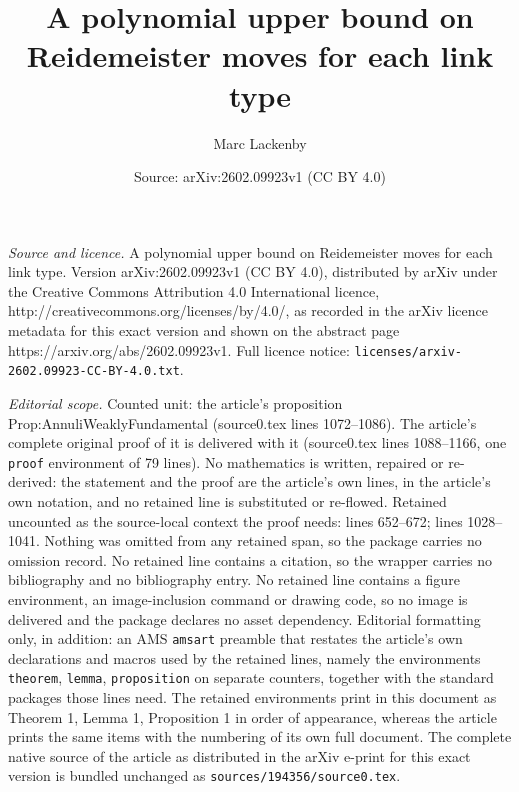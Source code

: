 \documentclass[10pt,a4paper]{amsart}
\title{A polynomial upper bound on Reidemeister moves for each link type}
\author{Marc Lackenby}
\date{Source: arXiv:2602.09923v1 (CC BY 4.0)}
\begin{document}
\maketitle

\noindent\emph{Source and licence.} A polynomial upper bound on Reidemeister moves for each link type. Version arXiv:2602.09923v1 (CC BY 4.0), distributed by arXiv under the Creative Commons Attribution 4.0 International licence, http://creativecommons.org/licenses/by/4.0/, as recorded in the arXiv licence metadata for this exact version and shown on the abstract page https://arxiv.org/abs/2602.09923v1. Full licence notice: \texttt{licenses/arxiv-2602.09923-CC-BY-4.0.txt}.\par\smallskip

\noindent\textit{Editorial scope.} Counted unit: the article's proposition Prop:AnnuliWeaklyFundamental (source0.tex lines 1072--1086). The article's complete original proof of it is delivered with it (source0.tex lines 1088--1166, one \texttt{proof} environment of 79 lines). No mathematics is written, repaired or re-derived: the statement and the proof are the article's own lines, in the article's own notation, and no retained line is substituted or re-flowed.  Retained uncounted as the source-local context the proof needs: lines 652--672; lines 1028--1041.  Nothing was omitted from any retained span, so the package carries no omission record.  No retained line contains a citation, so the wrapper carries no bibliography and no bibliography entry.  No retained line contains a figure environment, an image-inclusion command or drawing code, so no image is delivered and the package declares no asset dependency.  Editorial formatting only, in addition: an AMS \texttt{amsart} preamble that restates the article's own declarations and macros used by the retained lines, namely the environments \texttt{theorem}, \texttt{lemma}, \texttt{proposition} on separate counters, together with the standard packages those lines need.  The retained environments print in this document as Theorem 1, Lemma 1, Proposition 1 in order of appearance, whereas the article prints the same items with the numbering of its own full document.  The complete native source of the article as distributed in the arXiv e-print for this exact version is bundled unchanged as \texttt{sources/194356/source0.tex}.
\end{document}
